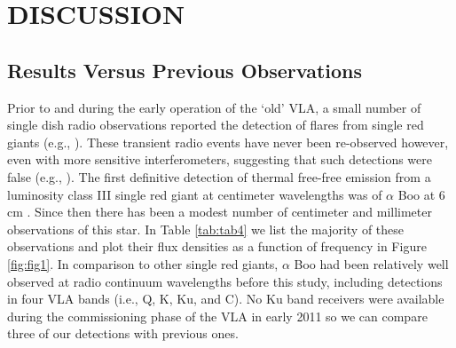 \documentclass[iop]{emulateapj}
\begin{document}
\section{DISCUSSION} \label{disc:disc0}
\subsection{Results Versus Previous Observations} \label{disc1}
Prior to and during the early operation of the `old' VLA, a small number of single dish radio observations reported the detection of flares from single red giants (e.g., \citealt{1981ApJ...245L..71B}). These transient radio events have never been re-observed however, even with more sensitive interferometers, suggesting that such detections were false (e.g., \citealt{1992MNRAS.254....1B}). The first definitive detection of thermal free-free emission from a luminosity class III single red giant at centimeter wavelengths was of $\alpha$ Boo at 6 cm \citep{1983ApJ...274L..77D,1986AJ.....91..602D}. Since then there has been a modest number of centimeter and millimeter observations of this star. In Table \ref{tab:tab4} we list the majority of these observations and plot their flux densities as a function of frequency in Figure \ref{fig:fig1}. In comparison to other single red giants, $\alpha$ Boo had been relatively well observed at radio continuum wavelengths before this study, including detections in four VLA bands (i.e., Q, K, Ku, and C). No Ku band receivers were available during the commissioning phase of the VLA in early 2011 so we can compare three of our detections with previous ones. 
\end{document}
